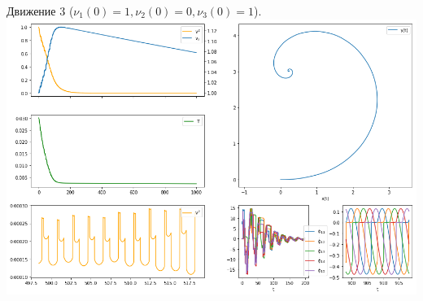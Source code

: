 \begin{frame}{Движение 3 ($\nu_1(0) = 1, \nu_2(0) = 0, \nu_3(0) = 1$).}
    \centering
    \includegraphics[width=\linewidth]{content/pic/new/impact_3.png}

\end{frame}
